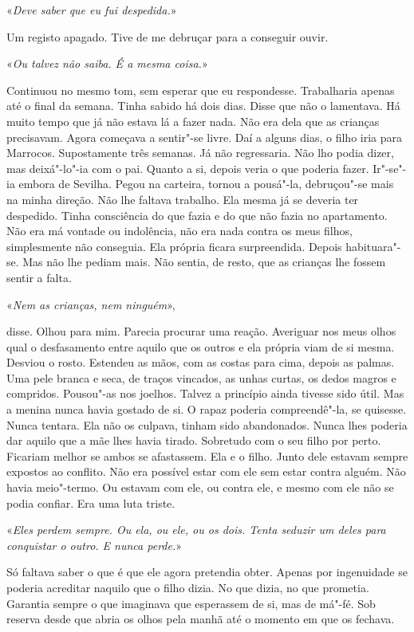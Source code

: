 «\emph{Deve saber que eu fui despedida.}»

Um registo apagado. Tive de me debruçar para a conseguir ouvir.

«\emph{Ou talvez não saiba. É a mesma coisa.}»

Continuou no mesmo tom, sem esperar que eu respondesse. Trabalharia
apenas até o final da semana. Tinha sabido há dois dias. Disse que não
o lamentava. Há muito tempo que já não estava lá a fazer nada. Não era
dela que as crianças precisavam. Agora começava a sentir"-se livre. Daí
a alguns dias, o filho iria para Marrocos. Supostamente três semanas. Já
não regressaria. Não lho podia dizer, mas deixá"-lo"-ia com o pai.
Quanto a si, depois veria o que poderia fazer. Ir"-se"-ia embora de
Sevilha. Pegou na carteira, tornou a pousá"-la, debruçou"-se mais na
minha direção. Não lhe faltava trabalho. Ela mesma já se deveria ter
despedido. Tinha consciência do que fazia e do que não fazia no
apartamento. Não era má vontade ou indolência, não era nada contra os
meus filhos, simplesmente não conseguia. Ela própria ficara
surpreendida. Depois habituara"-se. Mas não lhe pediam mais. Não sentia,
de resto, que as crianças lhe fossem sentir a falta.

«\emph{Nem as crianças, nem ninguém}»,

disse. Olhou para mim. Parecia procurar uma reação. Averiguar nos meus
olhos qual o desfasamento entre aquilo que os outros e ela própria viam
de si mesma. Desviou o rosto. Estendeu as mãos, com as costas para cima,
depois as palmas. Uma pele branca e seca, de traços vincados, as unhas
curtas, os dedos magros e compridos. Pousou"-as nos joelhos. Talvez a
princípio ainda tivesse sido útil. Mas a menina nunca havia gostado de
si. O rapaz poderia compreendê"-la, se quisesse. Nunca tentara. Ela não
os culpava, tinham sido abandonados. Nunca lhes poderia dar aquilo que a
mãe lhes havia tirado. Sobretudo com o seu filho por perto. Ficariam
melhor se ambos se afastassem. Ela e o filho. Junto dele estavam sempre
expostos ao conflito. Não era possível estar com ele sem estar contra
alguém. Não havia meio"-termo. Ou estavam com ele, ou contra ele, e
mesmo com ele não se podia confiar. Era uma luta triste.

«\emph{Eles perdem sempre. Ou ela, ou ele, ou os dois. Tenta seduzir um
deles para conquistar o outro. E nunca perde.}»

Só faltava saber o que é que ele agora pretendia obter. Apenas por
ingenuidade se poderia acreditar naquilo que o filho dizia. No que
dizia, no que prometia. Garantia sempre o que imaginava que esperassem
de si, mas de má"-fé. Sob reserva desde que abria os olhos pela manhã
até o momento em que os fechava.

